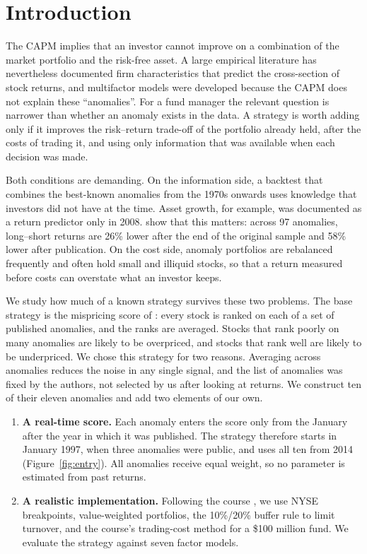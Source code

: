 \documentclass[12pt,a4paper]{article}
\begin{document}
\onehalfspacing
\section{Introduction}

The CAPM implies that an investor cannot improve on a combination of the market portfolio and the risk-free asset. A large empirical literature has nevertheless documented firm characteristics that predict the cross-section of stock returns, and multifactor models were developed because the CAPM does not explain these ``anomalies''. For a fund manager the relevant question is narrower than whether an anomaly exists in the data. A strategy is worth adding only if it improves the risk--return trade-off of the portfolio already held, after the costs of trading it, and using only information that was available when each decision was made.

Both conditions are demanding. On the information side, a backtest that combines the best-known anomalies from the 1970s onwards uses knowledge that investors did not have at the time. Asset growth, for example, was documented as a return predictor only in 2008. \citet{mclean2016} show that this matters: across 97 anomalies, long--short returns are 26\% lower after the end of the original sample and 58\% lower after publication. On the cost side, anomaly portfolios are rebalanced frequently and often hold small and illiquid stocks, so that a return measured before costs can overstate what an investor keeps.

We study how much of a known strategy survives these two problems. The base strategy is the mispricing score of \citet{stambaugh2017}: every stock is ranked on each of a set of published anomalies, and the ranks are averaged. Stocks that rank poorly on many anomalies are likely to be overpriced, and stocks that rank well are likely to be underpriced. We chose this strategy for two reasons. Averaging across anomalies reduces the noise in any single signal, and the list of anomalies was fixed by the authors, not selected by us after looking at returns. We construct ten of their eleven anomalies and add two elements of our own.

\begin{enumerate}
\item \textbf{A real-time score.} Each anomaly enters the score only from the January after the year in which it was published. The strategy therefore starts in January 1997, when three anomalies were public, and uses all ten from 2014 (Figure~\ref{fig:entry}). All anomalies receive equal weight, so no parameter is estimated from past returns.
\item \textbf{A realistic implementation.} Following the course \citep{goyal2026}, we use NYSE breakpoints, value-weighted portfolios, the 10\%/20\% buffer rule to limit turnover, and the course's trading-cost method for a \$100 million fund. We evaluate the strategy against seven factor models.
\end{enumerate}
\end{document}

